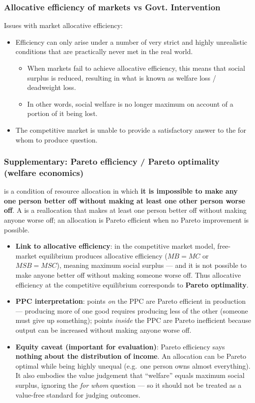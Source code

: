 \subsubsection*{Allocative efficiency of markets vs Govt. Intervention}
Issues with market allocative efficiency:
\begin{itemize}
  \item Efficiency can only arise under a number of very strict and highly unrealistic conditions that are practically never met in the real world.
  \begin{itemize}
    \item When markets fail to achieve allocative efficiency, this means that social surplus is reduced, resulting in what is known as welfare loss / deadweight loss.
    \item In other words, social welfare is no longer maximum on account of a portion of it being lost.
  \end{itemize}
  \item The competitive market is unable to provide a satisfactory answer to the for whom to produce question.
\end{itemize}
\subsubsection*{Supplementary: Pareto efficiency / Pareto optimality (welfare economics)}
 is a condition of resource allocation in which \textbf{it is impossible to make any one person better off without making at least one other person worse off}. A  is a reallocation that makes at least one person better off without making anyone worse off; an allocation is Pareto efficient when no Pareto improvement is possible.
\begin{itemize}
  \item \textbf{Link to allocative efficiency}: in the competitive market model, free-market equilibrium produces allocative efficiency ($MB = MC$ or $MSB = MSC$), meaning maximum social surplus --- and it is not possible to make anyone better off without making someone worse off. Thus allocative efficiency at the competitive equilibrium corresponds to \textbf{Pareto optimality}.
  \item \textbf{PPC interpretation}: points \textit{on} the PPC are Pareto efficient in production --- producing more of one good requires producing less of the other (someone must give up something); points \textit{inside} the PPC are Pareto inefficient because output can be increased without making anyone worse off.
  \item \textbf{Equity caveat (important for evaluation)}: Pareto efficiency says \textbf{nothing about the distribution of income}. An allocation can be Pareto optimal while being highly unequal (e.g.\ one person owns almost everything). It also embodies the value judgement that ``welfare'' equals maximum social surplus, ignoring the \textit{for whom} question --- so it should not be treated as a value-free standard for judging outcomes.
\end{itemize}
